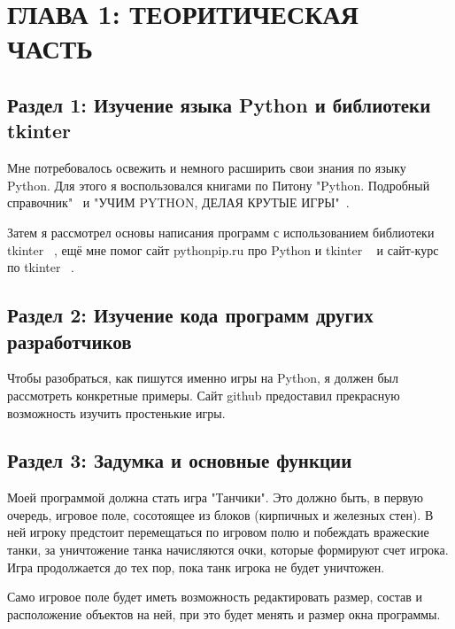 \chapter{\label{ch:ch01}ГЛАВА 1: ТЕОРИТИЧЕСКАЯ ЧАСТЬ} %

\section{\label{sec:ch01/sec01}Раздел 1: Изучение языка Python и библиотеки tkinter}

Мне потребовалось освежить и немного расширить свои знания по языку Python. Для этого я воспользовался книгами по Питону "Python. Подробный справочник"~\cite{book_Python} и "УЧИМ PYTHON, ДЕЛАЯ КРУТЫЕ ИГРЫ"~\cite{book_Python_2}.

Затем я рассмотрел основы написания программ с использованием библиотеки tkinter ~\cite{Python-tkinter},
ещё мне помог сайт pythonpip.ru про Python и tkinter ~\cite{Python-tkinter_2} и сайт-курс по tkinter ~\cite{Course-tkinter}.

\section{\label{sec:ch01/sec02}Раздел 2: Изучение кода программ других разработчиков}

Чтобы разобраться, как пишутся именно игры на Python, я должен был рассмотреть конкретные примеры. Сайт github предоставил прекрасную возможность изучить простенькие игры.


\section{\label{sec:ch01/sec03}Раздел 3: Задумка и основные функции}

Моей программой должна стать игра "Танчики". Это должно быть, в первую очередь, игровое поле, сосотоящее из блоков (кирпичных и железных стен). В ней игроку предстоит перемещаться по игровом полю и побеждать вражеские танки, за уничтожение танка начисляются очки, которые формируют счет игрока. Игра продолжается до тех пор, пока танк игрока не будет уничтожен.

Само игровое поле будет иметь возможность редактировать размер, состав и расположение объектов на ней, при это будет менять и размер окна программы.

